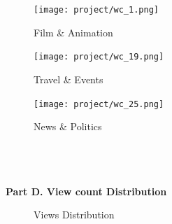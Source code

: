 \documentclass[english]{article}
\begin{document}
\begin{figure}[!htb]
      \texttt{[image: project/wc\_1.png]}
      \caption{Film \& Animation}\label{fig:awesome_image1}
    \endminipage\hfill
      \texttt{[image: project/wc\_19.png]}
      \caption{Travel \& Events}\label{fig:awesome_image2}
    \endminipage\hfill
      \texttt{[image: project/wc\_25.png]}
      \caption{News \& Politics} \label{fig:awesome_image3}
    \endminipage
    \end{figure}

 \pagebreak
 
\\
\\
\\
\bf{ Part D. View count Distribution}
\begin{figure}[H]
        \centering
        \caption{Views Distribution}
        \label{fig:my_label}
    \end{figure}
\end{document}
